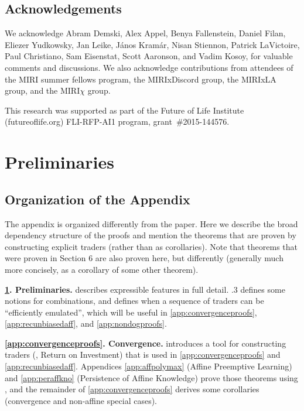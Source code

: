 \documentclass[authordate,onecolumn,noenvironments]{miri-tech-article}
\numberwithin{equation}{subsection}
\newcommand{\MainTextOnly}[1]{#1}
\begin{document}
\subsection{Acknowledgements}

We acknowledge Abram Demski, Alex Appel, Benya Fallenstein, Daniel Filan, Eliezer Yudkowsky, Jan Leike, J\'anos Kram\'ar, Nisan Stiennon, Patrick LaVictoire, Paul Christiano, Sam Eisenstat, Scott Aaronson, and Vadim Kosoy, for valuable comments and discussions. We also acknowledge contributions from attendees of the MIRI summer fellows program, the MIRIxDiscord group, the MIRIxLA group, and the MIRI$\chi$ group.

This research was supported as part of the Future of Life Institute (futureoflife.org) FLI-RFP-AI1 program, grant~\#2015-144576.

\printbibliography[heading=bibintoc,title={References}]
\newpage
\appendix
\renewcommand{\MainTextOnly}[1]{}

\section{Preliminaries}\label{app:preliminaries}

\subsection{Organization of the Appendix}

The appendix is organized differently from the paper. Here we describe the broad dependency structure of the proofs and mention the theorems that are proven by constructing explicit traders (rather than as corollaries). 
Note that theorems that were proven in Section 6 are also proven here, but differently (generally much more concisely, as a corollary of some other theorem). 

\textbf{\ref{app:preliminaries}. Preliminaries.}  describes expressible features in full detail. .3  defines some notions for combinations, and defines when a sequence of traders can be ``efficiently emulated'', which will be useful in \ref{app:convergenceproofs}, \ref{app:recunbiasedaff}, and \ref{app:nondogproofs}.

\textbf{\ref{app:convergenceproofs}. Convergence.}   introduces a tool for constructing traders (,  Return on Investment) that is used in  \ref{app:convergenceproofs} and \ref{app:recunbiasedaff}. Appendices \ref{app:affpolymax} (Affine Preemptive Learning)   and \ref{app:peraffkno} (Persistence of Affine Knowledge) prove those  theorems using , and the remainder of \ref{app:convergenceproofs} derives some corollaries (convergence and non-affine special cases). 
\end{document}
